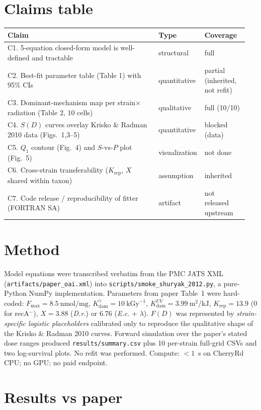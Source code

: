 \documentclass[11pt]{article}
\begin{document}
\section{Claims table}
\begin{longtable}{p{0.62\linewidth} p{0.15\linewidth} p{0.18\linewidth}}
\toprule
Claim & Type & Coverage \\
\midrule
\endhead
C1. 5-equation closed-form model is well-defined and tractable & structural & full \\
C2. Best-fit parameter table (Table 1) with 95\% CIs & quantitative & partial (inherited, not refit) \\
C3. Dominant-mechanism map per strain$\times$radiation (Table 2, 10 cells) & qualitative & full (10/10) \\
C4. $S(D)$ curves overlay Krisko \& Radman 2010 data (Figs.~1,3--5) & quantitative & blocked (data) \\
C5. $Q_1$ contour (Fig.~4) and $S$-vs-$P$ plot (Fig.~5) & visualization & not done \\
C6. Cross-strain transferability ($K_{\text{rep}}$, $X$ shared within taxon) & assumption & inherited \\
C7. Code release / reproducibility of fitter (FORTRAN SA) & artifact & not released upstream \\
\bottomrule
\end{longtable}

\section{Method}
Model equations were transcribed verbatim from the PMC JATS XML
(\texttt{artifacts/paper\_oai.xml}) into
\texttt{scripts/smoke\_shuryak\_2012.py}, a pure-Python NumPy implementation.
Parameters from paper Table~1 were hard-coded: $F_{\max} = 8.5\ \text{nmol/mg}$,
$K_{\text{dam}}^\gamma = 10\ \text{kGy}^{-1}$, $K_{\text{dam}}^{UV} = 3.99\ \text{m}^2/\text{kJ}$,
$K_{\text{rep}} = 13.9$ (0 for recA$^-$), $X = 3.88$ (\textit{D.r.}) or $6.76$
(\textit{E.c.} + $\lambda$). $F(D)$ was represented by \emph{strain-specific logistic
placeholders} calibrated only to reproduce the qualitative shape of the Krisko \& Radman
2010 curves. Forward simulation over the paper's stated dose ranges produced
\texttt{results/summary.csv} plus 10 per-strain full-grid CSVs and two log-survival plots.
No refit was performed. Compute: $<1$~s on CherryRd CPU; no GPU; no paid endpoint.

\section{Results vs paper}
\end{document}
